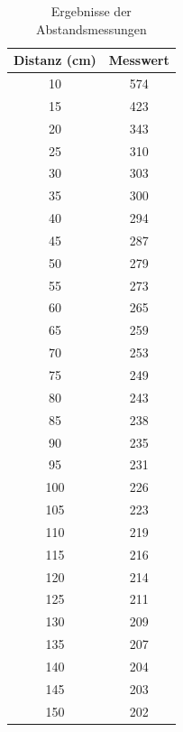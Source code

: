         \begin{table}
            \centering
            \caption{Ergebnisse der Abstandsmessungen}
            \begin{tabular}{ c c } 
                Distanz (cm) & Messwert\\ [0.5ex]
                \hline
                \hline
                10 & 574\\
                15 & 423\\
                20 & 343\\
                25 & 310\\
                30 & 303\\
                35 & 300\\
                40 & 294\\
                45 & 287\\
                50 & 279\\
                55 & 273\\
                60 & 265\\
                65 & 259\\
                70 & 253\\
                75 & 249\\
                80 & 243\\
                85 & 238\\
                90 & 235\\
                95 & 231\\
                100 & 226\\
                105 & 223\\
                110 & 219\\
                115 & 216\\
                120 & 214\\
                125 & 211\\
                130 & 209\\
                135 & 207\\
                140 & 204\\
                145 & 203\\
                150 & 202\\
            \end{tabular}            
            \label{tab:calibration}
        \end{table}

